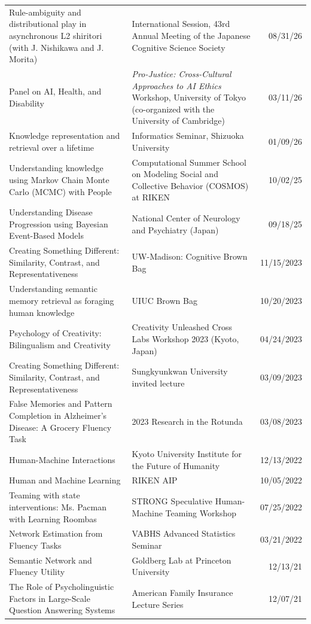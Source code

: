 \documentclass[a4paper,10pt]{article}
\begin{document}
\begin{longtabu} to \linewidth {XXr}
Rule-ambiguity and distributional play in asynchronous L2 shiritori (with J. Nishikawa and J. Morita) & International Session, 43rd Annual Meeting of the Japanese Cognitive Science Society & 08/31/26 \\
Panel on AI, Health, and Disability & {\em Pro-Justice: Cross-Cultural Approaches to AI Ethics} Workshop, University of Tokyo (co-organized with the University of Cambridge) & 03/11/26 \\
Knowledge representation and retrieval over a lifetime & Informatics Seminar, Shizuoka University & 01/09/26 \\
Understanding knowledge using Markov Chain Monte Carlo (MCMC) with People & Computational Summer School on Modeling Social and Collective Behavior (COSMOS) at RIKEN  & 10/02/25 \\
Understanding Disease Progression using Bayesian Event-Based Models & National Center of Neurology and Psychiatry (Japan) & 09/18/25 \\
Creating Something Different: Similarity, Contrast, and Representativeness & UW-Madison: Cognitive Brown Bag & 11/15/2023 \\
Understanding semantic memory retrieval as foraging human knowledge & UIUC Brown Bag & 10/20/2023 \\
Psychology of Creativity: Bilingualism and Creativity & Creativity Unleashed Cross Labs Workshop 2023 (Kyoto, Japan) & 04/24/2023 \\
Creating Something Different: Similarity, Contrast, and Representativeness & Sungkyunkwan University invited lecture & 03/09/2023 \\
False Memories and Pattern Completion in Alzheimer's Disease: A Grocery Fluency Task & 2023 Research in the Rotunda & 03/08/2023 \\
Human-Machine Interactions & Kyoto University Institute for the Future of Humanity & 12/13/2022 \\
Human and Machine Learning & RIKEN AIP & 10/05/2022 \\
Teaming with state interventions: Ms. Pacman with Learning Roombas & STRONG Speculative Human-Machine Teaming Workshop & 07/25/2022 \\
Network Estimation from Fluency Tasks & VABHS Advanced Statistics Seminar & 03/21/2022 \\
Semantic Network and Fluency Utility & Goldberg Lab at Princeton University & 12/13/21 \\
The Role of Psycholinguistic Factors in Large-Scale Question Answering Systems & American Family Insurance Lecture Series & 12/07/21 \\

\end{longtabu}
\end{document}
